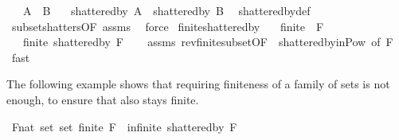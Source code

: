 \begin{isabellebody}
\ \ \ {\isachardoublequoteopen}A\ {\isasymsubseteq}\ B{\isachardoublequoteclose}\isanewline
\ \ \ {\isachardoublequoteopen}shattered{\isacharunderscore}{\kern0pt}by\ A\ {\isasymsubseteq}\ shattered{\isacharunderscore}{\kern0pt}by\ B{\isachardoublequoteclose}\ \isanewline
%
\isadelimproof
%
\endisadelimproof
%
\isatagproof
{}\isamarkupfalse%
\ shattered{\isacharunderscore}{\kern0pt}by{\isacharunderscore}{\kern0pt}def\ \isamarkupfalse%
\ subset{\isacharunderscore}{\kern0pt}shatters{\isacharbrackleft}{\kern0pt}OF\ assms{\isacharbrackright}{\kern0pt}\ \isamarkupfalse%
\ force%
\endisatagproof
{\isafoldproof}%
%
\isadelimproof
\isanewline
%
\endisadelimproof
\isanewline
{}\isamarkupfalse%
\ finite{\isacharunderscore}{\kern0pt}shattered{\isacharunderscore}{\kern0pt}by{\isacharcolon}{\kern0pt}\isanewline
\ \ \ {\isachardoublequoteopen}finite\ {\isacharparenleft}{\kern0pt}{\isasymUnion}\ F{\isacharparenright}{\kern0pt}{\isachardoublequoteclose}\isanewline
\ \ \ {\isachardoublequoteopen}finite\ {\isacharparenleft}{\kern0pt}shattered{\isacharunderscore}{\kern0pt}by\ F{\isacharparenright}{\kern0pt}{\isachardoublequoteclose}\isanewline
%
\isadelimproof
\ \ %
\endisadelimproof
%
\isatagproof
{}\isamarkupfalse%
\ assms\ rev{\isacharunderscore}{\kern0pt}finite{\isacharunderscore}{\kern0pt}subset{\isacharbrackleft}{\kern0pt}OF\ {\isacharunderscore}{\kern0pt}\ shattered{\isacharunderscore}{\kern0pt}by{\isacharunderscore}{\kern0pt}in{\isacharunderscore}{\kern0pt}Pow{\isacharcomma}{\kern0pt}\ of\ F{\isacharbrackright}{\kern0pt}\ \isamarkupfalse%
\ fast%
\endisatagproof
{\isafoldproof}%
%
\isadelimproof
%
\endisadelimproof
%
\begin{isamarkuptext}%
The following example shows that requiring finiteness of a family of sets is not enough, to ensure that  also stays finite.%
\end{isamarkuptext}\isamarkuptrue%
\isamarkupfalse%
\ {\isachardoublequoteopen}{\isasymexists}F{\isacharcolon}{\kern0pt}{\isacharcolon}{\kern0pt}nat\ set\ set{\isachardot}{\kern0pt}\ finite\ F\ {\isasymand}\ infinite\ {\isacharparenleft}{\kern0pt}shattered{\isacharunderscore}{\kern0pt}by\ F{\isacharparenright}{\kern0pt}{\isachardoublequoteclose}\isanewline
%
\isadelimproof
%
\endisadelimproof
%
\isatagproof
{}\isamarkupfalse%
\ {\isacharminus}{\kern0pt}\ \ \ \ \ \ \ \ \ \ \ \isanewline

\end{isabellebody}
